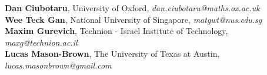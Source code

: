 \documentclass{article}
\begin{document}
{\bf Dan Ciubotaru}, University of Oxford,  \hfill {\it dan.ciubotaru@maths.ox.ac.uk \/} \\
{\bf Wee Teck Gan}, National University of Singapore,  \hfill {\it matgwt@nus.edu.sg \/} \\
{\bf Maxim Gurevich}, Technion - Israel Institute of Technology,  \hfill {\it maxg@technion.ac.il \/} \\
{\bf Lucas Mason-Brown}, The University of Texas at Austin,  \hfill {\it lucas.masonbrown@gmail.com \/} \\
\end{document}
